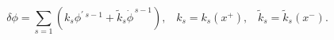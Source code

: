 \begin{equation}
\delta \phi =\sum_{s=1}(k_{s}\phi ^{\prime }{}^{\,s-1}+\tilde{k}_{s}\dot{\phi%
}^{\,s-1}),\;\;\;k_{s}=k_{s}(x^{+}),\;\;\;\tilde{k}_{s}=\tilde{k}_{s}(x^{-}).
\label{semirigid}
\end{equation}

